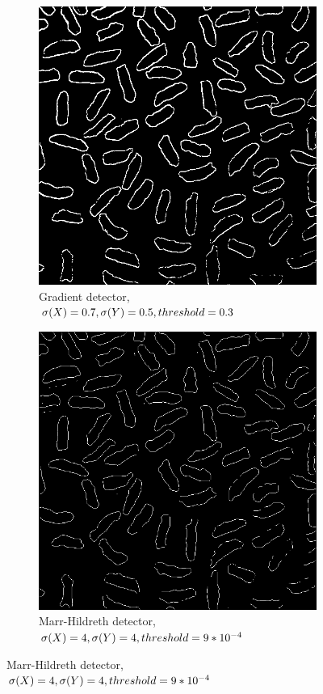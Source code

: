 \documentclass[a4paper]{article}
\begin{document}
\begin{figure}
\begin{subfigure}[b]{0.3\textwidth}
                \includegraphics[width=\textwidth]{q1-rice-mag.png}
                \caption{Gradient detector, \\$\sigma (X) = 0.7,  \sigma (Y) = 0.5, \\threshold = 0.3$}
                \label{fig:8b}
                
        \end{subfigure}
        \begin{subfigure}[b]{0.3\textwidth}
                \centering
                \includegraphics[width=\textwidth]{q1-rice-mh.png}
                \caption{Marr-Hildreth detector, \\$\sigma (X) = 4, \sigma (Y) = 4, \\threshold = 9*10^{-4}$}
                \label{fig:8c}
                

\end{subfigure}
\end{figure}
\end{document}

